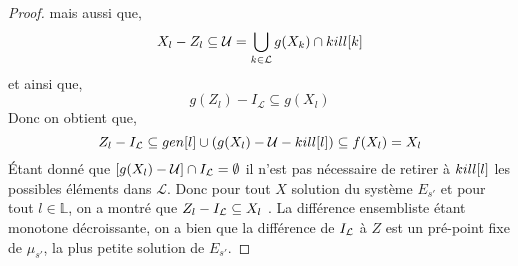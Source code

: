 \documentclass[a4paper, 10pt]{article}
\begin{document}
\begin{proof}
	mais aussi que, 
	\[X_l - Z_l \subseteq \mathcal{U} = \bigcup\limits_{k\in \mathcal{L}} g(X_k) \cap kill[k]\]
	et ainsi que,
	\[g(Z_l) - I_{\mathcal{L}} \subseteq g(X_l)\]
	Donc on obtient que,
	\[
		Z_l - I_{\mathcal{L}} \subseteq gen[l] \cup (g(X_l) - \mathcal{U} - kill[l]) \subseteq f(X_l) = X_l
	\]
	Étant donné que $[g(X_l) - \mathcal{U}] \cap I_{\mathcal{L}} = \emptyset$ il n'est pas nécessaire de retirer à $kill[l]$ les possibles
	éléments dans $\mathcal{L}$.
	Donc pour tout $X$ solution du système $E_{s'}$ et pour tout $l \in \mathbb{L}$, on a montré que $Z_l - I_{\mathcal{L}} \subseteq X_l$ .
	La différence ensembliste étant monotone décroissante, on a bien que la différence de $I_{\mathcal{L}}$ à $Z$
	est un pré-point fixe de $\mu_{s'}$, la plus petite solution de $E_{s'}$.
\end{proof}
\\
\\
\end{document}
